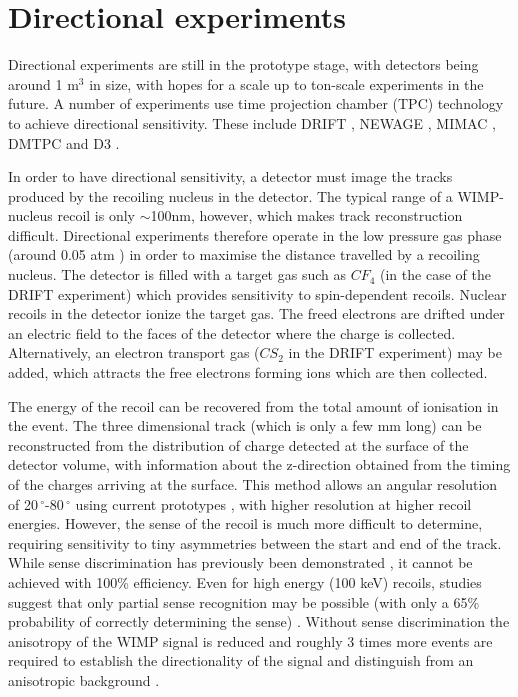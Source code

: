 \section{Directional experiments}
\label{sec:directional:experiments}
Directional experiments are still in the prototype stage, with detectors being around 1 $\textrm{m}^3$ in size, with hopes for a scale up to ton-scale experiments in the future. A number of experiments use time projection chamber (TPC) technology to achieve directional sensitivity. These include DRIFT \cite{Daw:2011,Daw:2012}, NEWAGE \cite{Miuchi:2010,Miuchi:2012}, MIMAC \cite{Riffard:2013, Santos:2013}, DMTPC \cite{Monroe:2012,Battat:2013} and D3 \cite{Vahsen:2012}.

In order to have directional sensitivity, a detector must image the tracks produced by the recoiling nucleus in the detector. The typical range of a WIMP-nucleus recoil is only $\sim$100nm, however, which makes track reconstruction difficult. Directional experiments therefore operate in the low pressure gas phase (around 0.05 atm \cite{Daw:2012}) in order to maximise the distance travelled by a recoiling nucleus. The detector is filled with a target gas such as $CF_4$ (in the case of the DRIFT experiment) which provides sensitivity to spin-dependent recoils. Nuclear recoils in the detector ionize the target gas. The freed electrons are drifted under an electric field to the faces of the detector where the charge is collected. Alternatively, an electron transport gas ($CS_2$ in the DRIFT experiment) may be added, which attracts the free electrons forming ions which are then collected. 

The energy of the recoil can be recovered from the total amount of ionisation in the event. The three dimensional track (which is only a few mm long) can be reconstructed from the distribution of charge detected at the surface of the detector volume, with information about the z-direction obtained from the timing of the charges arriving at the surface.  This method allows an angular resolution of 20$\,^{\circ}$-80$\,^{\circ}$ using current prototypes \cite{Billard:2012}, with higher resolution at higher recoil energies. However, the sense of the recoil is much more difficult to determine, requiring sensitivity to tiny asymmetries between the start and end of the track. While sense discrimination has previously been demonstrated \cite{Burgos:2008}, it cannot be achieved with 100\% efficiency. Even for high energy (100 keV) recoils, studies suggest that only partial sense recognition may be possible (with only a 65\% probability of correctly determining the sense) \cite{Billard:2012}. Without sense discrimination the anisotropy of the WIMP signal is reduced and roughly 3 times more events are required to establish the directionality of the signal and distinguish from an anisotropic background \cite{Morgan:2005,Green:2008}.

